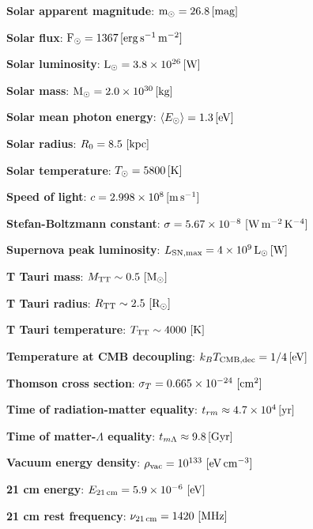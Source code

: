 \documentclass[a4paper,10pt]{article}
\begin{document}
{\noindent}\textbf{Solar apparent magnitude}: ${\rm m}_\odot = 26.8\,[{\rm mag}]$

{\noindent}\textbf{Solar flux}: ${\rm F}_\odot = 1367\,[{\rm erg\,s^{-1}\,m^{-2}}]$

{\noindent}\textbf{Solar luminosity}: ${\rm L}_\odot = 3.8\times10^{26}\,[{\rm W}]$

{\noindent}\textbf{Solar mass}: ${\rm M}_\odot = 2.0\times10^{30}\,[{\rm kg}]$

{\noindent}\textbf{Solar mean photon energy}: $\langle E_\odot \rangle = 1.3\,[{\rm eV}]$

{\noindent}\textbf{Solar radius}: $R_0 = 8.5 ~ [{\rm kpc}]$

{\noindent}\textbf{Solar temperature}: $T_\odot = 5800\,[{\rm K}]$

{\noindent}\textbf{Speed of light}: $c=2.998\times10^8\,[{\rm m\,s^{-1}}]$

{\noindent}\textbf{Stefan-Boltzmann constant}: $\sigma=5.67\times10^{-8} ~ [{\rm W\,m^{-2}\,K^{-4}}]$

{\noindent}\textbf{Supernova peak luminosity}: $L_\mathrm{SN,max} = 4\times10^9\,{\rm L_\odot}\,[{\rm W}]$

{\noindent}\textbf{T Tauri mass}: $M_{\rm TT}\sim0.5 ~ [{\rm M_\odot}]$

{\noindent}\textbf{T Tauri radius}: $R_{\rm TT}\sim2.5 ~ [{\rm R_\odot}]$

{\noindent}\textbf{T Tauri temperature}: $T_{\rm TT}\sim4000 ~ [{\rm K}]$

{\noindent}\textbf{Temperature at CMB decoupling}: $k_BT_\mathrm{CMB,dec} = 1/4\,[{\rm eV}]$

{\noindent}\textbf{Thomson cross section}: $\sigma_T=0.665\times10^{-24} ~ [{\rm cm^2}]$

{\noindent}\textbf{Time of radiation-matter equality}: $t_{rm} \approx 4.7\times10^{4}\,[{\rm yr}]$

{\noindent}\textbf{Time of matter-$\Lambda$ equality}: $t_{m\Lambda}
\approx9.8\,[{\rm Gyr}]$

{\noindent}\textbf{Vacuum energy density}: $\rho_\mathrm{vac} = 10^{133} ~ [{\rm eV\,cm^{-3}}]$

{\noindent}\textbf{21 cm energy}: $E_{21\,\mathrm{cm}} = 5.9\times10^{-6} ~ [{\rm eV}]$

{\noindent}\textbf{21 cm rest frequency}: $\nu_{21\,\mathrm{cm}} = 1420 ~ [{\rm MHz}]$
\end{document}
